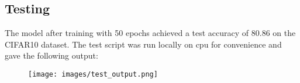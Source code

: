 \documentclass{ETHExercise}
\begin{document}
\newpage
\subsection{Testing}
The model after training with 50 epochs achieved a test accuracy of 80.86 on the CIFAR10 dataset.
The test script was run locally on cpu for convenience and gave the following output:
\begin{figure}[h]
  \centering
  \texttt{[image: images/test\_output.png]}
\end{figure}
\end{document}
